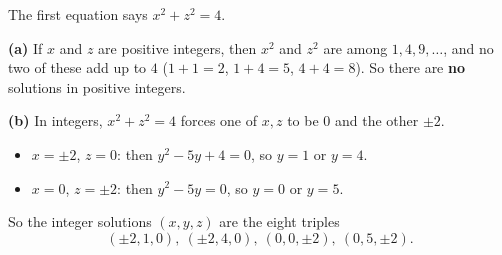 The first equation says $x^2+z^2=4$.

\textbf{(a)} If $x$ and $z$ are positive integers, then $x^2$ and $z^2$ are among $1,4,9,\dots$, and no two of these add up to $4$ ($1+1=2$, $1+4=5$, $4+4=8$). So there are \textbf{no} solutions in positive integers.

\textbf{(b)} In integers, $x^2+z^2=4$ forces one of $x,z$ to be $0$ and the other $\pm2$.
\begin{itemize}
\item $x=\pm2$, $z=0$: then $y^2-5y+4=0$, so $y=1$ or $y=4$.
\item $x=0$, $z=\pm2$: then $y^2-5y=0$, so $y=0$ or $y=5$.
\end{itemize}
So the integer solutions $(x,y,z)$ are the eight triples
\[\boxed{(\pm2,1,0),\ (\pm2,4,0),\ (0,0,\pm2),\ (0,5,\pm2)} .\]
